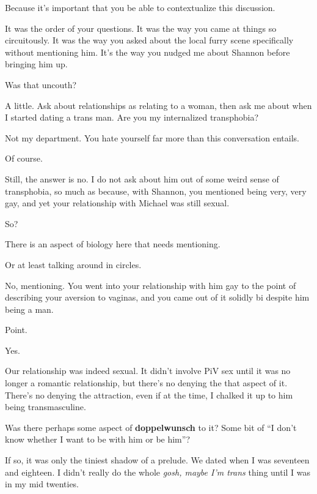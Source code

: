 \begin{leftcolumn}
\begin{ally}
Because it's important that you be able to contextualize this discussion.
\end{ally}
It was the order of your questions. It was the way you came at things so circuitously. It was the way you asked about the local furry scene specifically without mentioning him. It's the way you nudged me about Shannon before bringing him up.

\begin{ally}
Was that uncouth?
\end{ally}
A little. Ask about relationships as relating to a woman, then ask me about when I started dating a trans man. Are you my internalized transphobia?

\begin{ally}
Not my department. You hate yourself far more than this conversation entails.
\end{ally}
Of course.

\begin{ally}
Still, the answer is no. I do not ask about him out of some weird sense of transphobia, so much as because, with Shannon, you mentioned being very, very gay, and yet your relationship with Michael was still sexual.
\end{ally}
So?

\begin{ally}
There is an aspect of biology here that needs mentioning.
\end{ally}
Or at least talking around in circles.

\begin{ally}
No, mentioning. You went into your relationship with him gay to the point of describing your aversion to vaginas, and you came out of it solidly bi despite him being a man.
\end{ally}
Point.

\begin{ally}
Yes.
\end{ally}
Our relationship was indeed sexual. It didn't involve PiV sex until it was no longer a romantic relationship, but there's no denying the that aspect of it. There's no denying the attraction, even if at the time, I chalked it up to him being transmasculine.

\begin{ally}
Was there perhaps some aspect of \textbf{doppelwunsch} to it? Some bit of ``I don't know whether I want to be with him or be him''?
\end{ally}
If so, it was only the tiniest shadow of a prelude. We dated when I was seventeen and eighteen. I didn't really do the whole \emph{gosh, maybe I'm trans} thing until I was in my mid twenties.


\end{leftcolumn}
